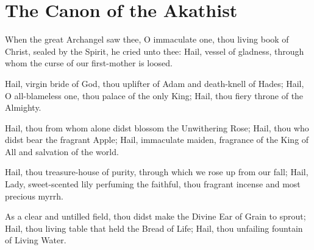 \documentclass[twoside, letterpaper, 12pt]{report}
\begin{document}




\readerline{\itistrulymeettoblessthee{}\\\morehonorablethanthetherubim}

\chapter*{The Canon of the Akathist}



When the great Archangel saw thee, O immaculate one,
thou living book of Christ, sealed by the Spirit, he cried unto thee:
Hail, vessel of gladness, through whom the curse of our first-mother is loosed.


Hail, virgin bride of God, thou uplifter of Adam and death-knell of Hades;
Hail, O all-blameless one, thou palace of the only King; Hail,
thou fiery throne of the Almighty.


Hail, thou from whom alone didst blossom the Unwithering Rose;
Hail, thou who didst bear the fragrant Apple;
Hail, immaculate maiden, fragrance of the King of All and salvation of the world.


Hail, thou treasure-house of purity, through which we rose up from our fall;
Hail, Lady, sweet-scented lily perfuming the faithful,
thou fragrant incense and most precious myrrh.





As a clear and untilled field, thou didst make the Divine Ear of Grain to sprout;
Hail, thou living table that held the Bread of Life;
Hail, thou unfailing fountain of Living Water.
\end{document}

